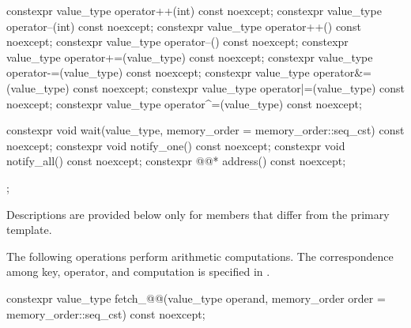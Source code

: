\begin{codeblock}
{{    constexpr value_type operator++(int) const noexcept;
    constexpr value_type operator--(int) const noexcept;
    constexpr value_type operator++() const noexcept;
    constexpr value_type operator--() const noexcept;
    constexpr value_type operator+=(value_type) const noexcept;
    constexpr value_type operator-=(value_type) const noexcept;
    constexpr value_type operator&=(value_type) const noexcept;
    constexpr value_type operator|=(value_type) const noexcept;
    constexpr value_type operator^=(value_type) const noexcept;

    constexpr void wait(value_type, memory_order = memory_order::seq_cst) const noexcept;
    constexpr void notify_one() const noexcept;
    constexpr void notify_all() const noexcept;
    constexpr @@* address() const noexcept;
  };
}
\end{codeblock}

\pnum
Descriptions are provided below only for members
that differ from the primary template.

\pnum
The following operations perform arithmetic computations.
The correspondence among key, operator, and computation is specified
in .

%
%
%
%
%
%
%
\begin{itemdecl}
constexpr value_type fetch_@@(value_type operand,
  memory_order order = memory_order::seq_cst) const noexcept;
\end{itemdecl}

